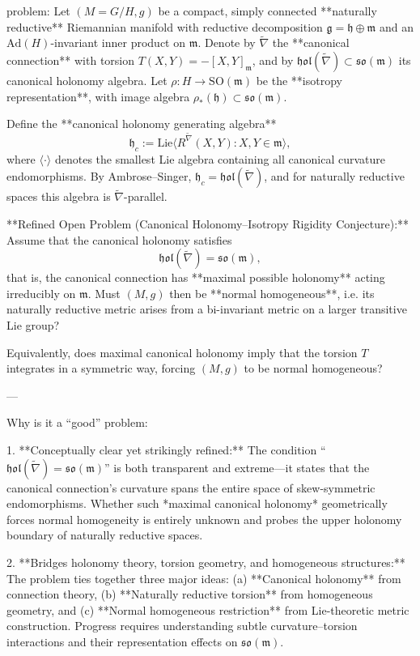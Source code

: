 problem:  
Let \( (M=G/H,g) \) be a compact, simply connected **naturally reductive** Riemannian manifold with reductive decomposition \( \mathfrak{g}=\mathfrak{h}\oplus\mathfrak{m}\) and an \(\mathrm{Ad}(H)\)-invariant inner product on \(\mathfrak{m}\).  
Denote by \( \tilde{\nabla} \) the **canonical connection** with torsion \(T(X,Y)=-[X,Y]_{\mathfrak m}\), and by \( \mathfrak{hol}(\tilde{\nabla}) \subset \mathfrak{so}(\mathfrak m) \) its canonical holonomy algebra.  
Let \( \rho: H \to \mathrm{SO}(\mathfrak m)\) be the **isotropy representation**, with image algebra \( \rho_*(\mathfrak h) \subset \mathfrak{so}(\mathfrak m)\).  

Define the **canonical holonomy generating algebra**
\[
\mathfrak{h}_c := \mathrm{Lie} \langle R^{\tilde{\nabla}}(X,Y) : X,Y\in \mathfrak{m}\rangle,
\]
where \(\langle \cdot \rangle\) denotes the smallest Lie algebra containing all canonical curvature endomorphisms.  By Ambrose–Singer, \(\mathfrak{h}_c = \mathfrak{hol}(\tilde{\nabla})\), and for naturally reductive spaces this algebra is \(\tilde{\nabla}\)-parallel.

**Refined Open Problem (Canonical Holonomy–Isotropy Rigidity Conjecture):**  
Assume that the canonical holonomy satisfies  
\[
\mathfrak{hol}(\tilde{\nabla}) = \mathfrak{so}(\mathfrak{m}),
\]
that is, the canonical connection has **maximal possible holonomy** acting irreducibly on \(\mathfrak{m}\).  
Must \( (M,g) \) then be **normal homogeneous**, i.e. its naturally reductive metric arises from a bi-invariant metric on a larger transitive Lie group?

Equivalently, does maximal canonical holonomy imply that the torsion \(T\) integrates in a symmetric way, forcing \( (M,g) \) to be normal homogeneous?

---

Why is it a “good” problem:  

1. **Conceptually clear yet strikingly refined:**  
   The condition “\(\mathfrak{hol}(\tilde{\nabla})=\mathfrak{so}(\mathfrak{m})\)” is both transparent and extreme—it states that the canonical connection’s curvature spans the entire space of skew-symmetric endomorphisms. Whether such *maximal canonical holonomy* geometrically forces normal homogeneity is entirely unknown and probes the upper holonomy boundary of naturally reductive spaces.

2. **Bridges holonomy theory, torsion geometry, and homogeneous structures:**  
   The problem ties together three major ideas:  
   (a) **Canonical holonomy** from connection theory,  
   (b) **Naturally reductive torsion** from homogeneous geometry, and  
   (c) **Normal homogeneous restriction** from Lie-theoretic metric construction.  
   Progress requires understanding subtle curvature–torsion interactions and their representation effects on \(\mathfrak{so}(\mathfrak{m})\).


